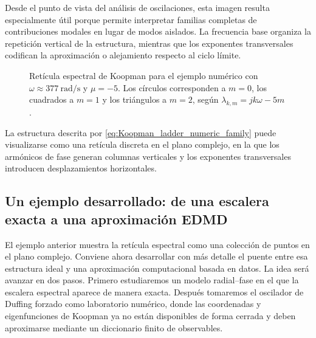 Desde el punto de vista del análisis de oscilaciones, esta imagen resulta especialmente útil porque permite interpretar familias completas de contribuciones modales en lugar de modos aislados. La frecuencia base organiza la repetición vertical de la estructura, mientras que los exponentes transversales codifican la aproximación o alejamiento respecto al ciclo límite.
\begin{figure}[t]
\centering
{}
\caption{Retícula espectral de Koopman para el ejemplo numérico con \(\omega\approx 377\ \text{rad/s}\) y \(\mu=-5\). Los círculos corresponden a \(m=0\), los cuadrados a \(m=1\) y los triángulos a \(m=2\), según \(\lambda_{k,m}=jk\omega-5m\).}
\label{fig:Koopman_ladder_numeric}
\end{figure}
La estructura descrita por \eqref{eq:Koopman_ladder_numeric_family} puede visualizarse como una retícula discreta en el plano complejo, en la que los armónicos de fase generan columnas verticales y los exponentes transversales introducen desplazamientos horizontales.
\subsection{Un ejemplo desarrollado: de una escalera exacta a una aproximación EDMD}

El ejemplo anterior muestra la retícula espectral como una colección de puntos en el plano complejo. Conviene ahora desarrollar con más detalle el puente entre esa estructura ideal y una aproximación computacional basada en datos. La idea será avanzar en dos pasos. Primero estudiaremos un modelo radial--fase en el que la escalera espectral aparece de manera exacta. Después tomaremos el oscilador de Duffing forzado como laboratorio numérico, donde las coordenadas y eigenfunciones de Koopman ya no están disponibles de forma cerrada y deben aproximarse mediante un diccionario finito de observables.

